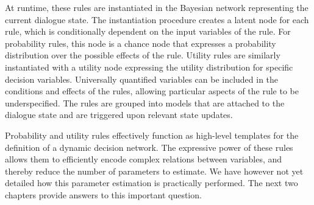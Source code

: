 At runtime, these rules are instantiated in the Bayesian network representing the current dialogue state. The instantiation procedure creates a latent node for each rule, which is conditionally dependent on the input variables of the rule.  For probability rules, this node is a chance node that expresses a probability distribution over the possible effects of the rule. Utility rules are similarly instantiated with a utility node expressing the utility distribution for specific decision variables.  Universally quantified variables can be included in the conditions and effects of the rules, allowing particular aspects of the rule to be underspecified. The rules are grouped into models that are attached to the dialogue state and are triggered upon relevant state updates. 

Probability and utility rules effectively function as high-level templates for the definition of a dynamic decision network. The expressive power of these rules allows them to efficiently encode complex relations between variables, and thereby reduce the number of parameters to estimate.  We have however not yet detailed how this parameter estimation is practically performed. The next two chapters provide answers to this important question. 

